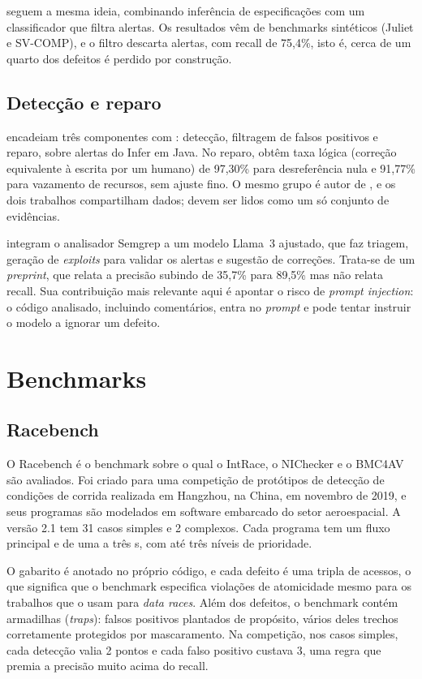  seguem a mesma ideia, combinando inferência de
especificações com um classificador que filtra alertas. Os resultados vêm de
benchmarks sintéticos (Juliet e SV-COMP), e o filtro descarta alertas, com
recall de 75,4\%, isto é, cerca de um quarto dos defeitos é perdido por
construção.

\subsection{Detecção e reparo}

 encadeiam três componentes com \llm: detecção,
filtragem de falsos positivos e reparo, sobre alertas do Infer em Java. No
reparo, obtêm taxa lógica (correção equivalente à escrita por um humano) de
97,30\% para desreferência nula e 91,77\% para vazamento de recursos, sem
ajuste fino. O mesmo grupo é autor de , e os dois
trabalhos compartilham dados; devem ser lidos como um só conjunto de evidências.

 integram o analisador Semgrep a um modelo Llama~3
ajustado, que faz triagem, geração de \textit{exploits} para validar os
alertas e sugestão de correções. Trata-se de um \textit{preprint}, que
relata a precisão subindo de 35,7\% para 89,5\% mas não relata recall. Sua
contribuição mais relevante aqui é apontar o risco de \textit{prompt
injection}: o código analisado, incluindo comentários, entra no
\textit{prompt} e pode tentar instruir o modelo a ignorar um defeito.

\section{Benchmarks}
\label{sec:rel-benchmarks}

\subsection{Racebench}

O Racebench \cite{racebench} é o benchmark sobre o qual o IntRace, o NIChecker e o BMC4AV são avaliados.
Foi criado para uma competição de protótipos de detecção de condições de
corrida realizada em Hangzhou, na China, em novembro de 2019, e seus programas
são modelados em software embarcado do setor aeroespacial. A versão 2.1 tem 31
casos simples e 2 complexos. Cada programa tem um fluxo principal e de uma a
três \isr s, com até três níveis de prioridade.

O gabarito é anotado no próprio código, e cada defeito é uma
tripla de acessos, o que significa que o benchmark especifica
violações de atomicidade mesmo para os trabalhos que o usam para
\textit{data races}. Além dos defeitos, o benchmark contém armadilhas
(\textit{traps}): falsos positivos plantados de propósito, vários deles trechos corretamente protegidos por mascaramento. Na competição, nos casos simples, cada detecção valia 2 pontos e cada falso positivo custava 3, uma regra que premia a
precisão muito acima do recall.

